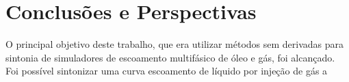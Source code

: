 \chapter{Conclusões e Perspectivas}
%
O principal objetivo deste trabalho, que era utilizar métodos sem derivadas para sintonia de simuladores de escoamento multifásico de óleo e gás, foi alcançado.
%
Foi possível sintonizar uma curva escoamento de líquido por injeção de gás a